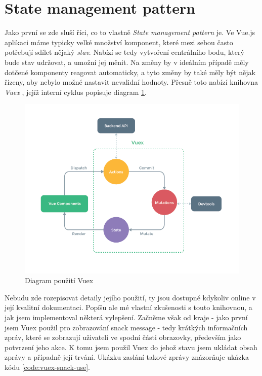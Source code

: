 
\section{State management pattern} \label{impl:vuex}

Jako první se zde sluší říci, co to vlastně \emph{State management pattern} je. Ve Vue.js aplikaci máme typicky velké množství komponent, které mezi sebou často potřebují sdílet nějaký \emph{stav}. Nabízí se tedy vytvoření centrálního bodu, který bude stav udržovat, a umožní jej měnit. Na změny by v ideálním případě měly dotčené komponenty reagovat automaticky, a tyto změny by také měly být nějak řízeny, aby nebylo možné nastavit nevalidní hodnoty. Přesně toto nabízí knihovna \emph{Vuex} \cite{vuex}, jejíž interní cyklus popisuje diagram \ref{picture:vuex}.

\begin{figure}[]
\includegraphics[width=\textwidth]{../png/diagrams/vuex.png}
\caption{Diagram použití Vuex}\label{picture:vuex}
\end{figure}

Nebudu zde rozepisovat detaily jejího použití, ty jsou dostupné kdykoliv online v její kvalitní dokumentaci. Popíšu ale mé vlastní zkušenosti s touto knihovnou, a jak jsem implementoval některá vylepšení. Začněme však od kraje - jako první jsem Vuex použil pro zobrazování snack message - tedy krátkých informačních zpráv, které se zobrazují uživateli ve spodní části obrazovky, především jako potvrzení jeho akce. K tomu jsem použil Vuex do jehož stavu jsem ukládat obsah zprávy a případně její trvání. Ukázku zaslání takové zprávy znázorňuje ukázka kódu \ref{code:vuex-snack-use}.

